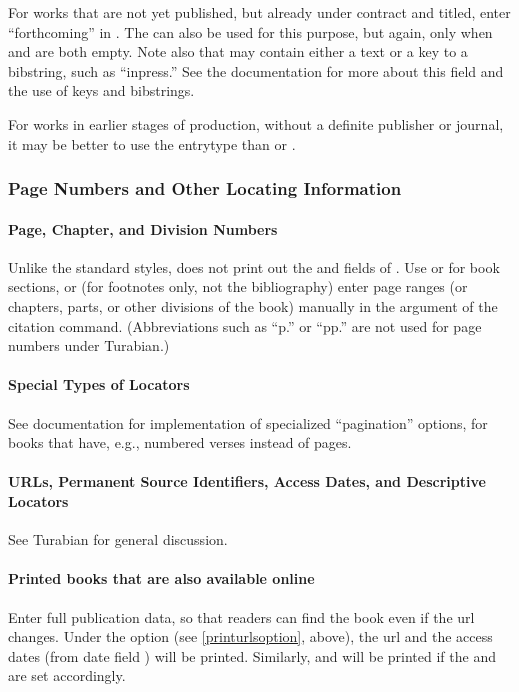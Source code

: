 \documentclass{ltxdockit}[2010/02/12]
\begin{document}
For works that are not yet published, but already under contract and titled, enter ``forthcoming'' in .\autocites[][]{2877} 
The  can also be used for this purpose, but again, only when  and  are both empty. Note also that  may contain either a text or a key to a bibstring, such as ``inpress.''\autocites{2877:pubstate} See the  documentation for more about this field and the use of keys and bibstrings.

For works in earlier stages of production, \ie without a definite publisher or journal, it may be better to use the entrytype  than  or .\autocites[][]{2877:unpub}


\subsubsection{Page Numbers and Other Locating Information}
\paragraph{Page, Chapter, and Division Numbers}
Unlike the standard  styles,  does not print out the  and  fields of . Use  or  for book sections, or (for footnotes only, not the bibliography) enter page ranges (or chapters, parts, or other divisions of the book) manually in the  argument of the citation command.\autocites[][1--22]{2221} (Abbreviations such as ``p.'' or ``pp.'' are not used for page numbers under Turabian.)


\paragraph{Special Types of Locators}

See  documentation for implementation of specialized ``pagination'' options, for books that have, e.g., numbered verses instead of pages.

\paragraph{URLs, Permanent Source Identifiers, Access Dates, and Descriptive Locators}

See Turabian for general discussion.

\paragraph{Printed books that are also available online}
Enter full publication data, so that readers can find the book even if the url changes. Under the option  (see \ref{printurlsoption}, above), the url and the access dates (from date field ) will be printed. Similarly,  and  will be printed if the  and  are set accordingly.\autocites[][]{2461} 
\end{document}
